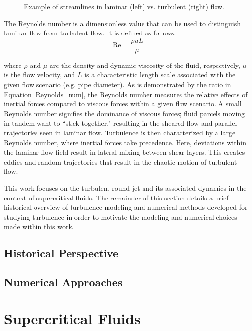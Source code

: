 \begin{figure}
\begin{center}
\end{center}
\caption{Example of streamlines in laminar (left) vs. turbulent (right) flow.}
\label{lam_vs_turb}
\end{figure}

The Reynolds number is a dimensionless value that can be used to distinguish laminar flow from turbulent flow. It is defined as follows:
\begin{equation}
\label{Reynolds_num}
\text{Re} = \frac{\rho u L}{\mu}
\end{equation}

\noindent where $\rho$ and $\mu$ are the density and dynamic viscosity of the fluid, respectively, $u$ is the flow velocity, and $L$ is a characteristic length scale associated with the given flow scenario (e.g. pipe diameter). As is demonstrated by the ratio in Equation \ref{Reynolds_num}, the Reynolds number measures the relative effects of inertial forces compared to viscous forces within a given flow scenario. A small Reynolds number signifies the dominance of viscous forces; fluid parcels moving in tandem want to ``stick together," resulting in the sheared flow and parallel trajectories seen in laminar flow. Turbulence is then characterized by a large Reynolds number, where inertial forces take precedence. Here, deviations within the laminar flow field result in lateral mixing between shear layers. This creates eddies and random trajectories that result in the chaotic motion of turbulent flow. 

This work focuses on the turbulent round jet and its associated dynamics in the context of supercritical fluids. The remainder of this section details a brief historical overview of turbulence modeling and numerical methods developed for studying turbulence in order to motivate the modeling and numerical choices made within this work.

\subsection{Historical Perspective}


\subsection{Numerical Approaches}


\section{Supercritical Fluids}

